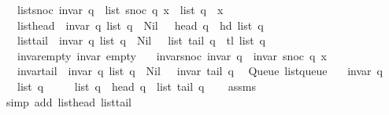 \begin{isabellebody}
\ \ \ list{\isacharunderscore}{\kern0pt}snoc{\isacharcolon}{\kern0pt}\ {\isachardoublequoteopen}invar\ q\ {\isasymLongrightarrow}\ list\ {\isacharparenleft}{\kern0pt}snoc\ q\ x{\isacharparenright}{\kern0pt}\ {\isacharequal}{\kern0pt}\ list\ q\ {\isacharat}{\kern0pt}\ {\isacharbrackleft}{\kern0pt}x{\isacharbrackright}{\kern0pt}{\isachardoublequoteclose}\isanewline
\ \ \ list{\isacharunderscore}{\kern0pt}head{\isacharcolon}{\kern0pt}\ {\isachardoublequoteopen}{\isasymlbrakk}\ invar\ q{\isacharsemicolon}{\kern0pt}\ list\ q\ {\isasymnoteq}\ Nil\ {\isasymrbrakk}\ {\isasymLongrightarrow}\ head\ q\ {\isacharequal}{\kern0pt}\ hd\ {\isacharparenleft}{\kern0pt}list\ q{\isacharparenright}{\kern0pt}{\isachardoublequoteclose}\isanewline
\ \ \ list{\isacharunderscore}{\kern0pt}tail{\isacharcolon}{\kern0pt}\ {\isachardoublequoteopen}{\isasymlbrakk}\ invar\ q{\isacharsemicolon}{\kern0pt}\ list\ q\ {\isasymnoteq}\ Nil\ {\isasymrbrakk}\ {\isasymLongrightarrow}\ list\ {\isacharparenleft}{\kern0pt}tail\ q{\isacharparenright}{\kern0pt}\ {\isacharequal}{\kern0pt}\ tl\ {\isacharparenleft}{\kern0pt}list\ q{\isacharparenright}{\kern0pt}{\isachardoublequoteclose}\isanewline
\ \ \ invar{\isacharunderscore}{\kern0pt}empty{\isacharcolon}{\kern0pt}\ {\isachardoublequoteopen}invar\ empty{\isachardoublequoteclose}\isanewline
\ \ \ invar{\isacharunderscore}{\kern0pt}snoc{\isacharcolon}{\kern0pt}\ {\isachardoublequoteopen}invar\ q\ {\isasymLongrightarrow}\ invar\ {\isacharparenleft}{\kern0pt}snoc\ q\ x{\isacharparenright}{\kern0pt}{\isachardoublequoteclose}\isanewline
\ \ \ invar{\isacharunderscore}{\kern0pt}tail{\isacharcolon}{\kern0pt}\ {\isachardoublequoteopen}{\isasymlbrakk}\ invar\ q{\isacharsemicolon}{\kern0pt}\ list\ q\ {\isasymnoteq}\ Nil\ {\isasymrbrakk}\ {\isasymLongrightarrow}\ invar\ {\isacharparenleft}{\kern0pt}tail\ q{\isacharparenright}{\kern0pt}{\isachardoublequoteclose}\isanewline
\isanewline
{}\isamarkupfalse%
\ {\isacharparenleft}{\kern0pt}\ Queue{\isacharparenright}{\kern0pt}\ list{\isacharunderscore}{\kern0pt}queue{\isacharcolon}{\kern0pt}\isanewline
\ \ \ {\isachardoublequoteopen}invar\ q{\isachardoublequoteclose}\isanewline
\ \ \ {\isachardoublequoteopen}list\ q\ {\isasymnoteq}\ {\isacharbrackleft}{\kern0pt}{\isacharbrackright}{\kern0pt}{\isachardoublequoteclose}\isanewline
\ \ \ {\isachardoublequoteopen}list\ q\ {\isacharequal}{\kern0pt}\ head\ q\ {\isacharhash}{\kern0pt}\ list\ {\isacharparenleft}{\kern0pt}tail\ q{\isacharparenright}{\kern0pt}{\isachardoublequoteclose}\isanewline
%
\isadelimproof
\ \ %
\endisadelimproof
%
\isatagproof
{}\isamarkupfalse%
\ assms\isanewline
\ \ \isamarkupfalse%
\ {\isacharparenleft}{\kern0pt}simp\ add{\isacharcolon}{\kern0pt}\ list{\isacharunderscore}{\kern0pt}head\ list{\isacharunderscore}{\kern0pt}tail{\isacharparenright}{\kern0pt}%
\endisatagproof
{\isafoldproof}%
%
\isadelimproof
\isanewline
%
\endisadelimproof
%
\isadelimtheory
\isanewline
%
\endisadelimtheory
%
\isatagtheory
{}\isamarkupfalse%
%
\endisatagtheory
{\isafoldtheory}%
%
\isadelimtheory
%
\endisadelimtheory
%
\end{isabellebody}%
